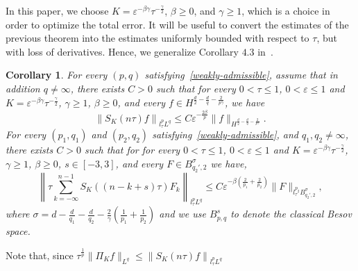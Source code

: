 \documentclass[10pt,a4paper]{article}
\newtheorem{corollary}[theorem]{Corollary}
\begin{document}

  In this paper, we choose \(K=\varepsilon^{-\beta\gamma}\tau^{-\frac\gamma2}\),
  \(\beta\geq0\), and \(\gamma \geq 1\), which is a choice in order to optimize
  the total error. It will be useful to convert the estimates of the previous
  theorem into the estimates uniformly bounded with respect to \(\tau\), but
  with loss of derivatives. Hence, we generalize Corollary \(4.3\)
  in~\cite{ORS21}.

  \begin{corollary}\label{corDSE}
    For every \((p,q)\) satisfying~\eqref{weakly-admissible}, assume that in addition
    \(q\neq \infty\), there exists \(C>0\) such that 
    for every \(0<\tau \leq 1\), \( 0 < \varepsilon \leq 1 \) and 
    \(K = \varepsilon^{-\beta\gamma}\tau^{-\frac\gamma2}\), \(\gamma \geq 1\), 
    \(\beta \geq 0\), and every \(f \in H^{\frac{d}2-\frac{d}q-\frac2{p\gamma}}\), we have
    \begin{equation}
    \label{Tloss}
      \left\| S_K (n\tau) f\right\|_{l^p_\tau L^q} \leq C \varepsilon^{-\frac{2\beta}p} 
      \|f \|_{H^{\frac{d}2-\frac{d}q-\frac2{p\gamma}}}. 
    \end{equation}
    For every \((p_1, q_1)\) and \((p_2, q_2)\) satisfying~\eqref{weakly-admissible}, 
    and \(q_1, q_2 \neq \infty\),
    there exists \(C>0\) such that for 
    for every \(0<\tau \leq 1\), \( 0 < \varepsilon \leq 1 \) and 
    \(K = \varepsilon^{-\beta\gamma}\tau^{-\frac\gamma2}\), \(\gamma \geq 1\), 
    \(\beta \geq 0\), \(s \in [-3,3]\), and every \(F \in 
    B^{\sigma}_{q_2',2}\)
    we have,
    \begin{equation}
    \label{TT*losscomplicate}
      \left\| \tau \sum_{k=-\infty}^{n-1} S_K ((n-k+s)\tau) F_k \right\|_{l^p_\tau L^q} 
      \leq C \varepsilon^{-\beta(\frac2{p_1}+\frac2{p_2})} \|F\|_{l^{p_2}_\tau 
      B^{\sigma}_{q_2',2}},
    \end{equation}
    where \(\sigma=d-\frac{d}{q_1}-\frac{d}{q_2}-\frac2{\gamma}(\frac1{p_1}+\frac1{p_2})\)
    and we use \(B^s_{p,q}\) to denote the classical Besov space.
  \end{corollary}
  Note that, since \(\tau^\frac1p\| \Pi_{K} f\|_{L^q} \leq  \left\| S_{K}(n \tau) f\right\|_{l^p_{\tau}L^q}\) 
\end{document}
